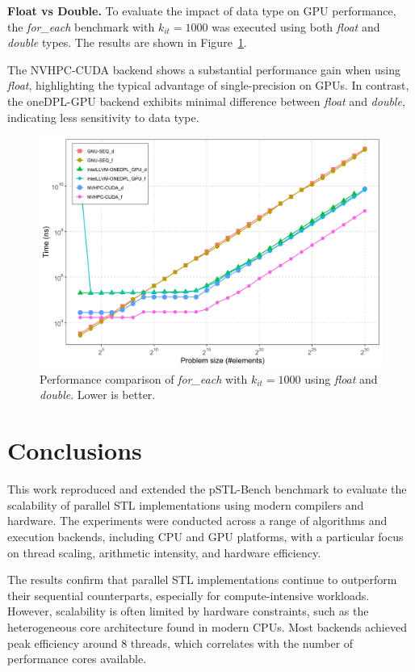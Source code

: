 \documentclass[sigconf]{acmart}
\newcommand{\mypar}[1]{{\bf #1.}}
\begin{document}
\mypar{Float vs Double}
To evaluate the impact of data type on GPU performance, the \textit{for\_each}
benchmark with $k_{it} = 1000$ was executed using both \textit{float} and
\textit{double} types. The results are shown in
Figure~\ref{fig:gpu_float_vs_double}.

The NVHPC-CUDA backend shows a substantial performance gain when using
\textit{float}, highlighting the typical advantage of single-precision on GPUs.
In contrast, the oneDPL-GPU backend exhibits minimal difference between
\textit{float} and \textit{double}, indicating less sensitivity to data type.

\begin{figure}[H]
      \centering
      \includegraphics[width=\linewidth]{figures/gpu-floatVSDouble-problemSize_time-for_each-k1000.png}
      \caption{Performance comparison of \textit{for\_each} with $k_{it} = 1000$
            using \textit{float} and \textit{double}. Lower is better.}
      \label{fig:gpu_float_vs_double}
\end{figure}

\section{Conclusions}

This work reproduced and extended the pSTL-Bench benchmark to evaluate the
scalability of parallel STL implementations using modern compilers and
hardware. The experiments were conducted across a range of algorithms and
execution backends, including CPU and GPU platforms, with a particular focus on
thread scaling, arithmetic intensity, and hardware efficiency.

The results confirm that parallel STL implementations continue to outperform
their sequential counterparts, especially for compute-intensive workloads.
However, scalability is often limited by hardware constraints, such as the
heterogeneous core architecture found in modern CPUs. Most backends achieved
peak efficiency around 8 threads, which correlates with the number of
performance cores available.
\end{document}
